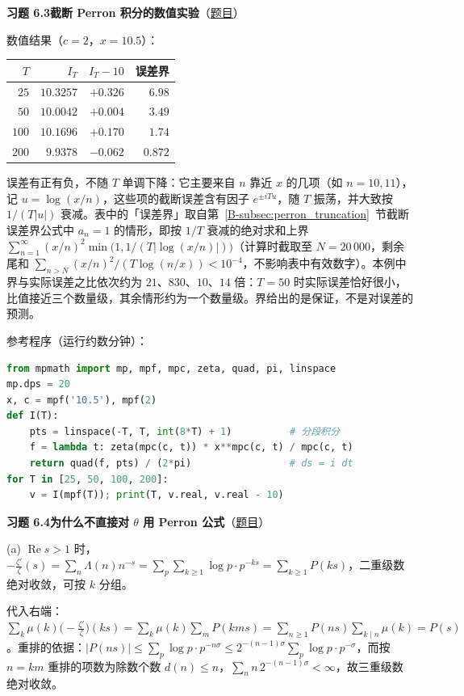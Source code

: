 \documentclass[11pt,a4paper]{article}
\renewcommand{\Re}{\operatorname{Re}}
\newcommand{\bref}[1]{\ref*{B-#1}}
\newcommand{\Sol}[2]{%
  \par\addvspace{1.2em}\noindent
  \hypertarget{s:#1}{}\textbf{习题 #1\quad #2}\hfill{\small（\hyperlink{q:#1}{题目}）}\par
  \nopagebreak\smallskip}
\begin{document}
\Sol{6.3}{截断 Perron 积分的数值实验}
数值结果（$c=2$，$x=10.5$）：
\begin{center}
\begin{tabular}{rrrr}
\toprule
$T$ & $I_T$ & $I_T-10$ & 误差界\\
\midrule
$25$ & $10.3257$ & $+0.326$ & $6.98$\\
$50$ & $10.0042$ & $+0.004$ & $3.49$\\
$100$ & $10.1696$ & $+0.170$ & $1.74$\\
$200$ & $9.9378$ & $-0.062$ & $0.872$\\
\bottomrule
\end{tabular}
\end{center}
误差有正有负，不随 $T$ 单调下降：它主要来自 $n$ 靠近 $x$ 的几项（如 $n=10,11$），记 $u=\log(x/n)$，这些项的截断误差含有因子 $e^{\pm iTu}$，随 $T$ 振荡，并大致按 $1/(T|u|)$ 衰减。表中的「误差界」取自第~\bref{subsec:perron_truncation}~节截断误差界公式中 $a_n=1$ 的情形，即按 $1/T$ 衰减的绝对求和上界 $\sum_{n=1}^\infty(x/n)^2\min\bigl(1,1/(T|\log(x/n)|)\bigr)$（计算时截取至 $N=20\,000$，剩余尾和 $\sum_{n>N}(x/n)^2/(T\log(n/x))<10^{-4}$，不影响表中有效数字）。本例中界与实际误差之比依次约为 $21$、$830$、$10$、$14$ 倍：$T=50$ 时实际误差恰好很小，比值接近三个数量级，其余情形约为一个数量级。界给出的是保证，不是对误差的预测。

参考程序（运行约数分钟）：
\begin{lstlisting}[language=Python]
from mpmath import mp, mpf, mpc, zeta, quad, pi, linspace
mp.dps = 20
x, c = mpf('10.5'), mpf(2)
def I(T):
    pts = linspace(-T, T, int(8*T) + 1)          # 分段积分
    f = lambda t: zeta(mpc(c, t)) * x**mpc(c, t) / mpc(c, t)
    return quad(f, pts) / (2*pi)                 # ds = i dt
for T in [25, 50, 100, 200]:
    v = I(mpf(T)); print(T, v.real, v.real - 10)
\end{lstlisting}

\Sol{6.4}{为什么不直接对 $\theta$ 用 Perron 公式}
(a) $\Re s>1$ 时，$-\frac{\zeta'}{\zeta}(s)=\sum_n\Lambda(n)n^{-s}=\sum_p\sum_{k\ge1}\log p\cdot p^{-ks}=\sum_{k\ge1}P(ks)$，二重级数绝对收敛，可按 $k$ 分组。

代入右端：$\sum_k\mu(k)\bigl(-\frac{\zeta'}{\zeta}\bigr)(ks)=\sum_k\mu(k)\sum_mP(kms)=\sum_{n\ge1}P(ns)\sum_{k\mid n}\mu(k)=P(s)$。重排的依据：$|P(ns)|\le\sum_p\log p\cdot p^{-n\sigma}\le2^{-(n-1)\sigma}\sum_p\log p\cdot p^{-\sigma}$，而按 $n=km$ 重排的项数为除数个数 $d(n)\le n$，$\sum_nn\,2^{-(n-1)\sigma}<\infty$，故三重级数绝对收敛。
\end{document}
